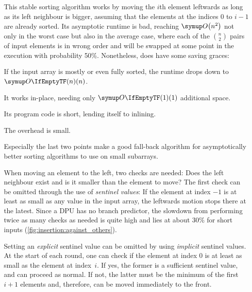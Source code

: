 \subsection{\texorpdfstring{\IS{}}{InsertionSort}}
\label{subsec:single:insertion}


This stable sorting algorithm works by moving the \(i\)th element leftwards as long as its left neighbour is bigger, assuming that the elements at the indices \(0\) to \(i - 1\) are already sorted.
Its asymptotic runtime is bad, reaching \(\bigoh*{n^2}\) not only in the worst case but also in the average case, where each of the \(\binom{n}{2}\) pairs of input elements is in wrong order and will be swapped at some point in the execution with probability 50\%.
Nonetheless, \IS{} does have some saving graces:
\begin{enumerate*}
	\item
	If the input array is mostly or even fully sorted, the runtime drops down to \(\bigoh{n}\).

	\item
	It works in-place, needing only \(\bigoh{1}\) additional space.

	\item
	Its program code is short, lending itself to inlining.

	\item
	The overhead is small.
\end{enumerate*}
Especially the last two points make \IS{} a good fall-back algorithm for asymptotically better sorting algorithms to use on small subarrays.

When moving an element to the left, two checks are needed:
Does the left neighbour exist and is it smaller than the element to move?
The first check can be omitted through the use of \emph{sentinel values}:
If the element at index \(-1\) is at least as small as any value in the input array, the leftwards motion stops there at the latest.
Since a DPU has no branch predictor, the slowdown from performing twice as many checks as needed is quite high and lies at about 30\% for short inputs (\cref{fig:insertion:against_others}).

Setting an \emph{explicit} sentinel value can be omitted by using \emph{implicit} sentinel values.
At the start of each round, one can check if the element at index \(0\) is at least as small as the element at index~\(i\).
If yes, the former is a sufficient sentinel value, and \IS{} can proceed as normal.
If not, the latter must be the minimum of the first \(i + 1\) elements and, therefore, can be moved immediately to the front.

